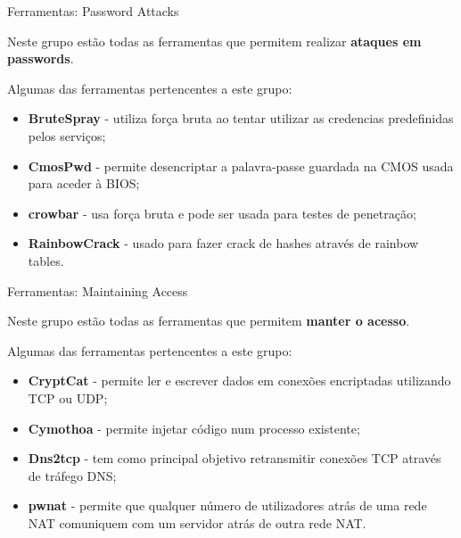 \documentclass{beamer}
\begin{document}
\begin{frame}{Ferramentas: Password Attacks}

Neste grupo estão todas as ferramentas que permitem realizar \textbf{ataques em passwords}.

\hfill

Algumas das ferramentas pertencentes a este grupo:
    \begin{itemize}
        \item \textbf{BruteSpray} - utiliza força bruta ao tentar utilizar as credencias predefinidas pelos serviços;
        \item \textbf{CmosPwd} - permite desencriptar a palavra-passe guardada na CMOS usada para aceder à BIOS;
        \item \textbf{crowbar} - usa força bruta e pode ser usada para testes de penetração;
        \item \textbf{RainbowCrack} - usado para fazer crack de hashes através de rainbow tables.
    \end{itemize}
\end{frame}
\begin{frame}{Ferramentas: Maintaining Access}

Neste grupo estão todas as ferramentas que permitem \textbf{manter o acesso}.

\hfill

Algumas das ferramentas pertencentes a este grupo:
    \begin{itemize}
        \item \textbf{CryptCat} - permite ler e escrever dados em conexões encriptadas utilizando TCP ou UDP;
        \item \textbf{Cymothoa} - permite injetar código num processo existente;
        \item \textbf{Dns2tcp} - tem como principal objetivo retransmitir conexões TCP através de tráfego DNS;
        \item \textbf{pwnat} - permite que qualquer número de utilizadores atrás de uma rede NAT comuniquem com um servidor atrás de outra rede NAT.
    \end{itemize}
\end{frame}
\end{document}
